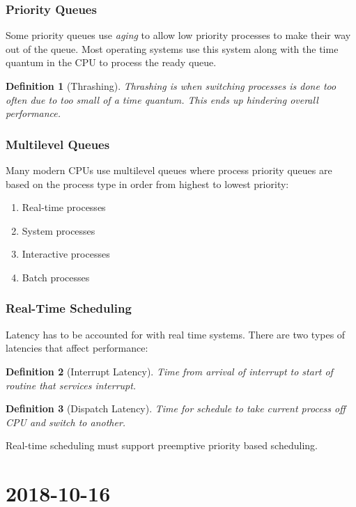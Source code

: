 \documentclass{report}
\newtheorem*{defn}{Definition}
\newcommand{\mychapter}[2]{
	\setcounter{chapter}{#1}
	\setcounter{section}{0}
	\chapter*{#2}
	\addcontentsline{toc}{chapter}{#2}
}
\begin{document}
\subsection*{Priority Queues}
Some priority queues use \textit{aging} to allow low priority processes to make their way out of the queue. Most operating systems use this system along with the time quantum in the CPU to process the ready queue.\\

\begin{defn}[Thrashing] Thrashing is when switching processes is done too often due to too small of a time quantum. This ends up hindering overall performance.
\end{defn}

\subsection*{Multilevel Queues}
Many modern CPUs use multilevel queues where process priority queues are based on the process type in order from highest to lowest priority:
\begin{enumerate}
	\item Real-time processes
	\item System processes
	\item Interactive processes
	\item Batch processes
\end{enumerate}

\subsection*{Real-Time Scheduling}
Latency has to be accounted for with real time systems. There are two types of latencies that affect performance:

\begin{defn}[Interrupt Latency]
	Time from arrival of interrupt to start of routine that services interrupt.
\end{defn}

\begin{defn}[Dispatch Latency]
	Time for schedule to take current process off CPU and switch to another.
\end{defn}

\noindent
Real-time scheduling must support preemptive priority based scheduling.

\mychapter{4}{2018-10-16}
\end{document}
